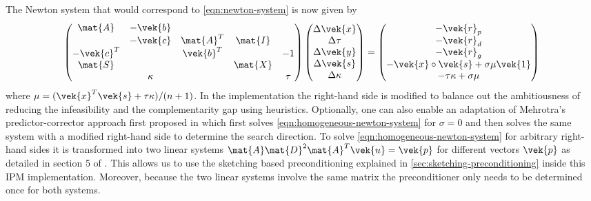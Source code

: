 The Newton system that would correspond to \cref{eqn:newton-system} is now given by
\begin{equation}\label{eqn:homogeneous-newton-system}
  \begin{pmatrix}
    \mat{A}    & -\vek{b} &           &         &         \\
               & -\vek{c} & \mat{A}^T & \mat{I} &         \\
    -\vek{c}^T &          & \vek{b}^T &         & -1 \\
    \mat{S}    &          &           & \mat{X} &         \\
               & \kappa   &           &         & \tau
  \end{pmatrix}
  \begin{pmatrix}
    \Delta\vek{x} \\
    \Delta\tau \\
    \Delta\vek{y} \\
    \Delta\vek{s} \\
    \Delta\kappa
  \end{pmatrix}
  =
  \begin{pmatrix}
    -\vek{r}_p \\
    -\vek{r}_d \\
    -\vek{r}_g \\
    -\vek{x} \circ \vek{s} + \sigma \mu \vek{1} \\
    -\tau \kappa + \sigma \mu
  \end{pmatrix}
\end{equation}
where \(\mu = (\vek{x}^T \vek{s} + \tau \kappa)/(n+1)\).
In the implementation the right-hand side is modified to balance out the ambitiousness of reducing the infeasibility and the complementarity gap using heuristics.
Optionally, one can also enable an adaptation of Mehrotra's predictor-corrector approach first proposed in \cite{Mehrotra-PredictorCorrector} which first solves \cref{eqn:homogeneous-newton-system} for \(\sigma = 0\) and then solves the same system with a modified right-hand side to determine the search direction.
To solve \cref{eqn:homogeneous-newton-system} for arbitrary right-hand sides it is transformed into two linear systems \(\mat{A}\mat{D}^2\mat{A}^T\vek{u} = \vek{p}\) for different vectors \(\vek{p}\) as detailed in section 5 of \cite{AndersenAndersen-MosekInteriorPointMethod}.
This allows us to use the sketching based preconditioning explained in \cref{sec:sketching-preconditioning} inside this IPM implementation.
Moreover, because the two linear systems involve the same matrix the preconditioner only needs to be determined once for both systems.

